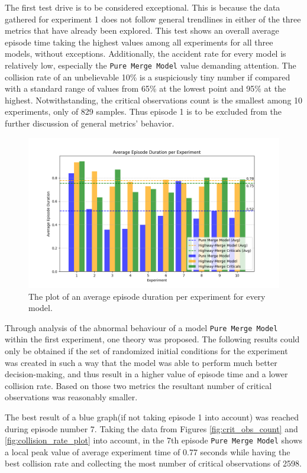 The first test drive is to be considered exceptional. This is because the data gathered for experiment 1 does not follow general trendlines in either of the three metrics that have already been explored. This test shows an overall average episode time taking the highest values among all experiments for all three models, without exceptions. Additionally, the accident rate for every model is relatively low, especially the \texttt{Pure Merge Model} value demanding attention. The collision rate of an unbelievable 10\% is a suspiciously tiny number if compared with a standard range of values from 65\% at the lowest point and 95\% at the highest. Notwithstanding, the critical observations count is the smallest among 10 experiments, only of 829 samples. Thus episode 1 is to be excluded from the further discussion of general metrics' behavior.
\begin{figure}[H]
    \centering
    \includegraphics[width=\textwidth]{images/Average_times_plot.png}
    \caption{The plot of an average episode duration per experiment for every model.}
    \label{fig:avg_times_plot}
\end{figure}

Through analysis of the abnormal behaviour of a model \texttt{Pure Merge Model} within the first experiment, one theory was proposed. The following results could only be obtained if the set of randomized initial conditions for the experiment was created in such a way that the model was able to perform much better decision-making, and thus result in a higher value of episode time and a lower collision rate. Based on those two metrics the resultant number of critical observations was reasonably smaller.

The best result of a blue graph(if not taking episode 1 into account) was reached during episode number 7. Taking the data from Figures \ref{fig:crit_obs_count} and  \ref{fig:collision_rate_plot} into account, in the 7th episode \texttt{Pure Merge Model} shows a local peak value of average experiment time of 0.77 seconds while having the best collision rate and collecting the most number of critical observations of 2598. 

